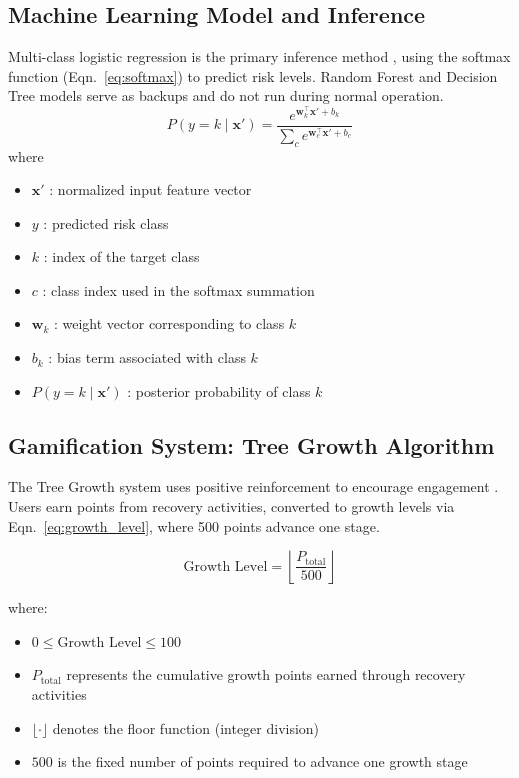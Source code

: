 \documentclass[a4paper]{article}
\begin{document}
\subsection{Machine Learning Model and Inference}
Multi-class logistic regression is the primary inference method \cite{b2}, using the softmax function (Eqn.~\eqref{eq:softmax}) to predict risk levels. Random Forest and Decision Tree models serve as backups and do not run during normal operation.
\begin{equation}
P(y = k \mid \mathbf{x}') =
\frac{e^{\mathbf{w}_k^{\top}\mathbf{x}' + b_k}}
{\sum_{c} e^{\mathbf{w}_c^{\top}\mathbf{x}' + b_c}}
\label{eq:softmax}
\end{equation}
where
\begin{itemize}
  \item $\mathbf{x}'$ : normalized input feature vector
  \item $y$ : predicted risk class
  \item $k$ : index of the target class
  \item $c$ : class index used in the softmax summation
  \item $\mathbf{w}_k$ : weight vector corresponding to class $k$
  \item $b_k$ : bias term associated with class $k$
  \item $P(y = k \mid \mathbf{x}')$ : posterior probability of class $k$
\end{itemize}


\subsection{Gamification System: Tree Growth Algorithm}
The Tree Growth system uses positive reinforcement to encourage engagement \cite{b7}. Users earn points from recovery activities, converted to growth levels via Eqn.~\eqref{eq:growth_level}, where 500 points advance one stage.

\begin{equation}
\text{Growth Level} = \left\lfloor \frac{P_{\text{total}}}{500} \right\rfloor
\label{eq:growth_level}
\end{equation}

\noindent where:
\begin{itemize}
    \item $0 \leq \text{Growth Level} \leq 100$
    \item $P_{\text{total}}$ represents the cumulative growth points earned through recovery activities
    \item $\lfloor \cdot \rfloor$ denotes the floor function (integer division)
    \item $500$ is the fixed number of points required to advance one growth stage
\end{itemize}
\end{document}

